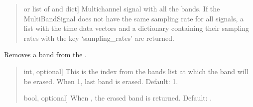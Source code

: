 \documentclass[letterpaper,10pt,english]{sphinxmanual}
\begin{document}
\begin{fulllineitems}
\begin{fulllineitems}
\begin{quote}
\begin{description}
\begin{description}
\end{description}

\begin{description}
\sphinxlineitem{\sphinxstylestrong{sig}}{[} or list of  and dict{]}
\sphinxAtStartPar
Multichannel signal with all the bands. If the MultiBandSignal
does not have the same sampling rate for all signals, a list with
the time data vectors and a dictionary containing their sampling
rates with the key ‘sampling\_rates’ are returned.

\end{description}

\end{description}\end{quote}

\end{fulllineitems}


\begin{fulllineitems}
\label{\detokenize{classes:dsptools.classes.multibandsignal.MultiBandSignal.remove_band}}
\pysigstartsignatures
{}
\pysigstopsignatures
\sphinxAtStartPar
Removes a band from the .
\begin{quote}\begin{description}
\begin{description}
\sphinxlineitem{\sphinxstylestrong{index}}{[}int, optional{]}
\sphinxAtStartPar
This is the index from the bands list at which the band
will be erased. When \sphinxhyphen{}1, last band is erased.
Default: \sphinxhyphen{}1.

\sphinxlineitem{\sphinxstylestrong{return\_band}}{[}bool, optional{]}
\sphinxAtStartPar
When , the erased band is returned. Default: .


\end{description}
\end{description}
\end{quote}
\end{fulllineitems}
\end{fulllineitems}
\end{document}
